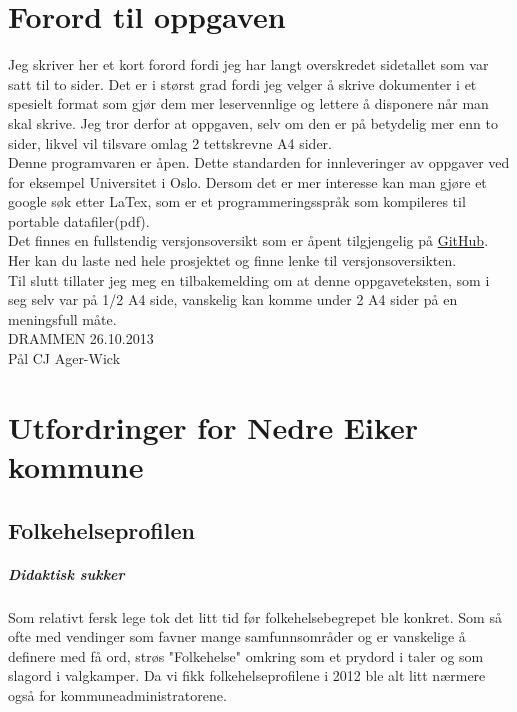 \documentclass[12pt]{memoir} %
\begin{document}

\chapter{Forord til oppgaven}
	Jeg skriver her et kort forord fordi jeg har langt overskredet sidetallet som var satt til to sider. Det er i størst grad fordi jeg velger å skrive dokumenter i et spesielt format som gjør dem mer leservennlige og lettere å disponere når man skal skrive. Jeg tror derfor at oppgaven, selv om den er på betydelig mer enn to sider, likvel vil tilsvare omlag 2 tettskrevne A4 sider.\\

	Denne programvaren er åpen. Dette standarden for innleveringer av oppgaver ved for eksempel Universitet i Oslo. Dersom det er mer interesse kan man gjøre et google søk etter LaTex, som er et programmeringsspråk som kompileres til portable datafiler(pdf).\\

	Det finnes en fullstendig versjonsoversikt som er åpent tilgjengelig på \href{http://pcjawick.github.io/Folkehelseoppgave}{GitHub}. Her kan du laste ned hele prosjektet og finne lenke til versjonsoversikten.\\

	Til slutt tillater jeg meg en tilbakemelding om at denne oppgaveteksten, som i seg selv var på 1/2 A4 side, vanskelig kan komme under 2 A4 sider på en meningsfull måte.\\[0.7in]



DRAMMEN 26.10.2013\\[0.4in]

Pål CJ Ager-Wick

\newpage

\tableofcontents

\mainmatter

\chapter{Utfordringer for Nedre Eiker kommune}
	\section{Folkehelseprofilen}
		\paragraph{Didaktisk sukker\\}
			Som relativt fersk lege tok det litt tid før folkehelsebegrepet ble konkret. Som så ofte med vendinger som favner mange samfunnsområder og er vanskelige å definere med få ord, strøs "Folkehelse" omkring som et prydord i taler og som slagord i valgkamper. Da vi fikk folkehelseprofilene i 2012 ble alt litt nærmere også for kommuneadministratorene.  
\end{document}
